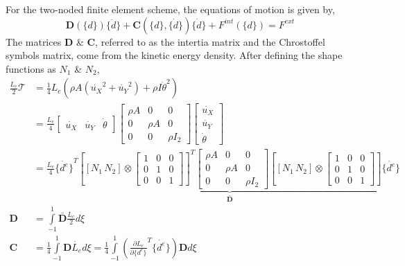 \documentclass[10pt]{article}
\begin{document}
For the two-noded finite element scheme, the equations of motion is
given by,
\begin{equation}
  \bm{D}(\{d\})\{\ddot{d}\} + \bm{C}(\{d\}, \{\dot{d}\})\{\dot{d}\} +
  F^{int}(\{d\}) = F^{ext}
  \label{eq:eom}
\end{equation}
The matrices $\bm{D}$ \& $\bm{C}$, referred to as the intertia matrix
and the Chrostoffel symbols matrix, come from the kinetic energy
density. After defining the shape functions as $N_1$ \& $N_2$,
\begin{align}
  \frac{L_e}{2}\mathcal{T} &= \frac{1}{4}L_e\left(\rho A(\dot{u_X}^2 +
                             \dot{u_Y}^2) + \rho I\dot{\theta}^2\right)\nonumber\\
  &= \frac{L_e}{4} \begin{bmatrix}\dot{u_X} & \dot{u_Y} &
    \dot{\theta} \end{bmatrix} \begin{bmatrix} \rho A &0 &0\\ 0& \rho
    A&0\\ 0&0& \rho I_2 \end{bmatrix} \begin{bmatrix}\dot{u_X}\\ \dot{u_Y}\\
    \dot{\theta} \end{bmatrix}\nonumber\\
                           &= \frac{L_e}{4} {\{\dot{d^e} \}}^T
                             \underbrace{{\left[ [N_1\, N_2]
                             \otimes \begin{bmatrix} 1&0&0\\ 0&1&0\\
                               0&0&1 \end{bmatrix}\right]}^T \begin{bmatrix}
                           \rho A &0 &0\\ 0& \rho A&0\\ 0&0& \rho
                           I_2 \end{bmatrix} \left[ [N_1\, N_2]
                                                             \otimes \begin{bmatrix}
                                                               1&0&0\\
                                                               0&1&0\\
                                                               0&0&1 \end{bmatrix}\right]}_{\bar{\bm{D}}}
                                                                    \{
                                                                    \dot{d^e}
                                                                    \}
                                                                    \nonumber\\
  \bm{D} &= \int\limits_{-1}^1 \bar{\bm{D}}\frac{L_e}{2}
           d\xi\nonumber\\
  \bm{C} &= \frac{1}{4}\int\limits_{-1}^1\bm{D}\dot{L_e}d\xi =
           \frac{1}{4}\int\limits_{-1}^1 \left({\frac{\partial
           L_e}{\partial \{d^e\}}}^T\{\dot{d^e}\}\right) \bm{D} d\xi
  \label{eq:kedensred}
\end{align}
\end{document}
